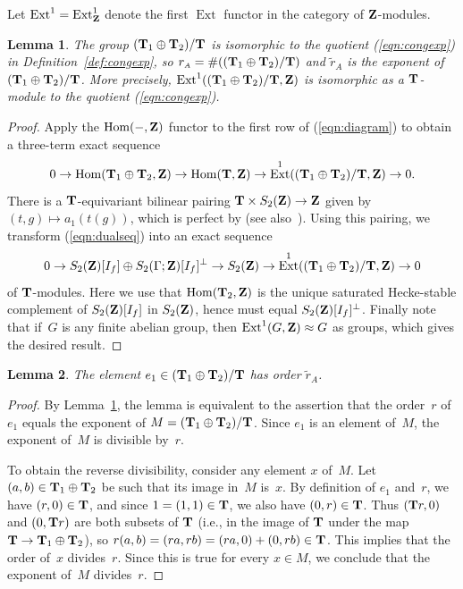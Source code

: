 \documentclass[10pt,twoside]{article}
\newcommand{\Z}{{\bf{Z}}}
\newcommand{\T}{{\bf{T}}}
\newcommand{\rA}{{r_{\scriptscriptstyle{A}}}}
\newcommand{\rAe}{{\tilde{r}_{\scriptscriptstyle{A}}}}
\newcommand{\Hom}{{\rm Hom}}
\newtheorem{lem}{Lemma}[section]
\theoremstyle{definition}
\DeclareMathOperator{\Ext}{Ext}
\begin{document}
Let $\Ext^1 = \Ext^1_{\Z}$ denote the first $\Ext$ functor
in the category of $\Z$-modules.

\begin{lem}\label{lem:compare_with_dual}
The group $(\T_1 \oplus \T_2)/\T$ is isomorphic to 
the quotient (\ref{eqn:congexp})
 in Definition~\ref{def:congexp}, so 
 $\rA = \#((\T_1 \oplus \T_2)/\T)$ and $\rAe$ is the
exponent of $(\T_1 \oplus \T_2)/\T$. 
More precisely,  $\Ext^1((\T_1 \oplus \T_2)/\T,\Z)$ is isomorphic as a
$\T$-module to the quotient (\ref{eqn:congexp}). 
\end{lem}
\begin{proof}
Apply the $\Hom(-,\Z)$ functor to the first row of (\ref{eqn:diagram})
to obtain a three-term exact sequence
\begin{equation}\label{eqn:dualseq}
0  \to \Hom(\T_1\oplus \T_2,\Z) \to \Hom(\T,\Z)
\to \Ext^1((\T_1\oplus\T_2)/\T,\Z) \to 0. 
\end{equation}
There is a $\T$-equivariant bilinear pairing $\T\times
S_2(\Z)\to\Z$ given by $(t,g)\mapsto a_1(t(g))$, which is perfect by
\cite[Lemma~2.1]{abbull} (see also~\cite[Theorem~2.2]{ribet:modp}). 
Using this pairing, we transform (\ref{eqn:dualseq}) into an exact
sequence
$$
0 \to S_2(\Z)[I_f] \oplus S_2(\Gamma;\Z)[I_f]^{\perp} \to S_2(\Z) \to
\Ext^1((\T_1\oplus\T_2)/\T,\Z) \to 0
$$
of $\T$-modules. 
Here we use that $\Hom(\T_2,\Z)$ is the unique saturated
Hecke-stable complement of $S_2(\Z)[I_f]$ in $S_2(\Z)$, hence
must equal $S_2(\Z)[I_f]^{\perp}$. 
Finally note that if~$G$ is any finite abelian group, then
$\Ext^1(G,\Z)\approx G$ as groups, which gives the desired result. 
\end{proof}

\begin{lem}\label{lem:ord_e1}
The element $e_1 \in (\T_1 \oplus \T_2)/\T$ has order $\rAe$. 
\end{lem}
\begin{proof}
  By Lemma~\ref{lem:compare_with_dual}, the lemma is equivalent to the
  assertion that the order~$r$ of~$e_1$ equals the exponent of
  $M=(\T_1 \oplus \T_2)/\T$.  Since $e_1$ is an element of~$M$, the
  exponent of~$M$ is divisible by~$r$.  
  
  To obtain the reverse divisibility, consider any element $x$ of~$M$.
  Let $(a,b)\in\T_1\oplus \T_2$ be such that its image in~$M$ is~$x$.
  By definition of $e_1$ and~$r$, we have $(r,0)\in\T$, and since
  $1=(1,1)\in\T$, we also have $(0,r)\in\T$.  Thus $(\T{}r,0)$ and
  $(0,\T{}r)$ are both subsets of $\T$ (i.e., in the image of $\T$
  under the map $\T\to\T_1\oplus \T_2$), so $r(a,b)
  =(ra,rb)=(ra,0)+(0,rb)\in \T$.  This implies that the order of~$x$
  divides~$r$. Since this is true for every $x \in M$, we conclude
  that the exponent of~$M$ divides~$r$.
\end{proof}
\end{document}
